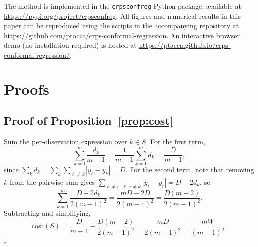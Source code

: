 \documentclass[11pt]{article}
\begin{document}
The method is implemented in the \texttt{crpsconfreg} Python package,
available at \url{https://pypi.org/project/crpsconfreg}.
All figures and numerical results in this paper can be reproduced using the
scripts in the accompanying repository at \url{https://github.com/ptocca/crps-conformal-regression}.
An interactive browser demo (no installation required) is hosted at
\url{https://ptocca.github.io/crps-conformal-regression/}.




\appendix

\section{Proofs}
\label{app:proofs}

\subsection*{Proof of Proposition~\ref{prop:cost}}

Sum the per-observation expression over $k \in S$.
For the first term,
\[
  \sum_{k=1}^m \frac{d_k}{m-1}
  = \frac{1}{m-1}\sum_{k=1}^m d_k
  = \frac{D}{m-1},
\]
since $\sum_k d_k = \sum_k \sum_{\ell\ne k}|y_\ell - y_k| = D$.
For the second term, note that removing $k$ from the pairwise sum gives
$\sum_{\ell\ne r,\,\ell,r\ne k}|y_\ell-y_r| = D - 2d_k$, so
\[
  \sum_{k=1}^m \frac{D - 2d_k}{2(m-1)^2}
  = \frac{mD - 2D}{2(m-1)^2}
  = \frac{D(m-2)}{2(m-1)^2}.
\]
Subtracting and simplifying,
\[
  \mathrm{cost}(S)
  = \frac{D}{m-1} - \frac{D(m-2)}{2(m-1)^2}
  = \frac{mD}{2(m-1)^2}
  = \frac{mW}{(m-1)^2}.
\]
\noindent\hfill$\square$

%
\end{document}
